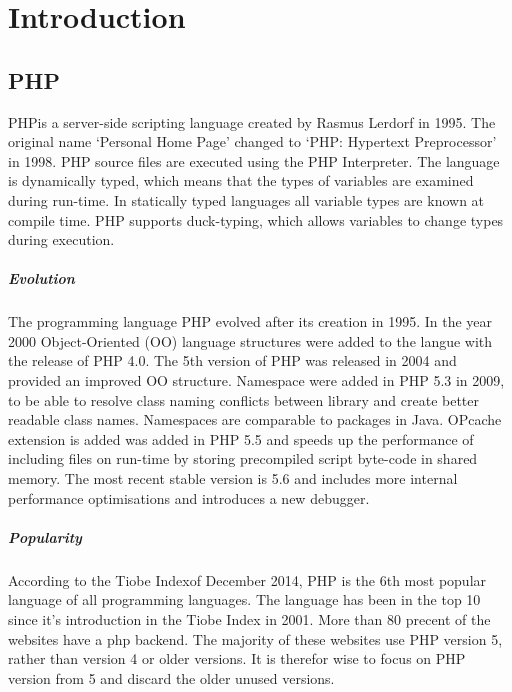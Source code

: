 \documentclass[../main.tex]{subfiles}
\begin{document}
    \chapter{Introduction}\label{ch:introduction}

    \section{PHP} %
        PHP\footnotemark is a server-side scripting language created by Rasmus Lerdorf in 1995.
        The original name `Personal Home Page' changed to `PHP: Hypertext Preprocessor' in 1998.
        PHP source files are executed using the PHP Interpreter. 
        The language is dynamically typed, which means that the types of variables are examined during run-time.
        In statically typed languages all variable types are known at compile time.
        PHP supports duck-typing, which allows variables to change types during execution.
        
        \paragraph{Evolution}
        The programming language PHP evolved after its creation in 1995.
        In the year 2000 Object-Oriented (OO) language structures were added to the langue with the release of PHP 4.0.
        The 5th version of PHP was released in 2004 and provided an improved OO structure.
        Namespace were added in PHP 5.3 in 2009, to be able to resolve class naming conflicts between library and create better readable class names.
        Namespaces are comparable to packages in Java.
        OPcache extension is added was added in PHP 5.5 and speeds up the performance of including files on run-time by storing precompiled script byte-code in shared memory.
        The most recent stable version is 5.6 and includes more internal performance optimisations and introduces a new debugger.
       
        \paragraph{Popularity}
        According to the Tiobe Index\footnotemark of December 2014, PHP is the 6th most popular language of all programming languages.
        The language has been in the top 10 since it's introduction in the Tiobe Index in 2001.
        More than 80 precent of the websites have a php backend\footnotemark.
        The majority of these websites use PHP version 5, rather than version 4 or older versions.
        It is therefor wise to focus on PHP version from 5 and discard the older unused versions.
            
\end{document}
